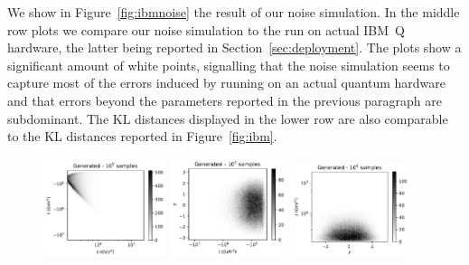 \documentclass[twocolumn,preprintnumbers,superscriptaddress]{revtex4-2}
\begin{document}
We show in Figure~\ref{fig:ibmnoise} the result of our noise simulation. In the middle row plots we compare our noise simulation
to the run on actual IBM~Q hardware, the latter being reported in Section~\ref{sec:deployment}. The plots show a significant amount
of white points, signalling that the noise simulation seems to capture most of the errors induced by running on an actual quantum
hardware and that errors beyond the parameters reported in the previous paragraph are subdominant. The KL distances displayed in
the lower row are also comparable to the KL distances reported in Figure~\ref{fig:ibm}. 

\begin{figure}

  \includegraphics[width=0.32\textwidth]{plots/hardware_noise_simulation/s-t_FAKE_100k_noise-simu.pdf}%
  \includegraphics[width=0.305\textwidth]{plots/hardware_noise_simulation/t-y_FAKE_100k_noise-simu.pdf}%
  \includegraphics[width=0.31\textwidth]{plots/hardware_noise_simulation/y-s_FAKE_100k_noise-simu.pdf}


\end{figure}
\end{document}
